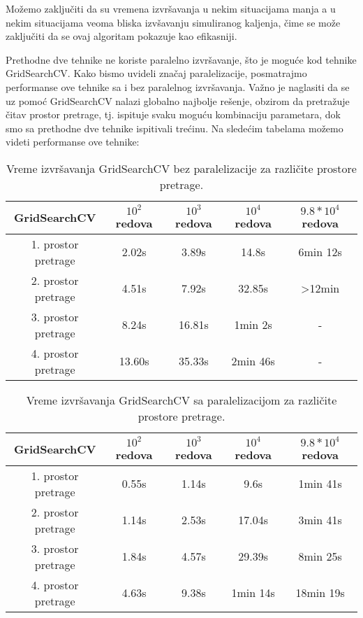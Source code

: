 \documentclass{article}
\begin{document}
\noindent Možemo zaključiti da su vremena izvršavanja u nekim situacijama manja a u nekim situacijama veoma bliska izvšavanju simuliranog kaljenja, čime se može zaključiti da se ovaj algoritam pokazuje kao efikasniji.\newline

\noindent Prethodne dve tehnike ne koriste paralelno izvršavanje, što je moguće kod tehnike GridSearchCV. Kako bismo uvideli značaj paralelizacije, posmatrajmo performanse ove tehnike sa i bez paralelnog izvršavanja. Važno je naglasiti da se uz pomoć GridSearchCV nalazi globalno najbolje rešenje, obzirom da pretražuje čitav prostor pretrage, tj. ispituje svaku moguću kombinaciju parametara, dok smo sa prethodne dve tehnike ispitivali trećinu. Na sledećim tabelama možemo videti performanse ove tehnike:\newline
\vspace{0.25 cm}

\begin{table}[h]
\centering
\begin{tabular}{|c|c|c|c|c|}
\hline
 GridSearchCV& $10^2$ redova & $10^3$ redova & $10^4$ redova & $9.8*10^4$ redova \\
\hline
1. prostor pretrage & 2.02s & 3.89s & 14.8s & 6min 12s\\
\hline
2. prostor pretrage & 4.51s & 7.92s & 32.85s & >12min\\
\hline
3. prostor pretrage & 8.24s & 16.81s & 1min 2s & -\\
\hline
4. prostor pretrage & 13.60s & 35.33s  & 2min 46s & -\\
\hline
\end{tabular}
\caption{Vreme izvršavanja GridSearchCV bez paralelizacije za različite prostore pretrage.}
\end{table}

\begin{table}[h]
\centering
\begin{tabular}{|c|c|c|c|c|}
\hline
 GridSearchCV& $10^2$ redova & $10^3$ redova & $10^4$ redova & $9.8*10^4$ redova \\
\hline
1. prostor pretrage & 0.55s & 1.14s & 9.6s & 1min 41s\\
\hline
2. prostor pretrage & 1.14s & 2.53s & 17.04s & 3min 41s\\
\hline
3. prostor pretrage & 1.84s & 4.57s & 29.39s & 8min 25s\\
\hline
4. prostor pretrage & 4.63s & 9.38s  & 1min 14s & 18min 19s\\
\hline
\end{tabular}
\caption{Vreme izvršavanja GridSearchCV sa paralelizacijom za različite prostore pretrage.}
\end{table}
\vspace{0.25 cm}
\end{document}
